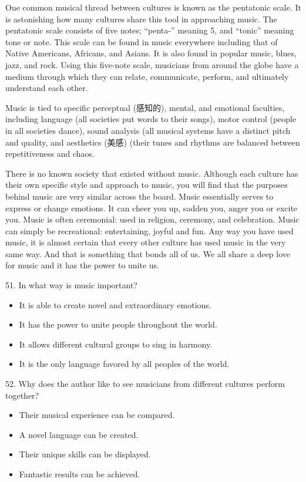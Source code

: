 \documentclass[UTF8,11pt]{ctexart}
\begin{document}
One common musical thread between cultures is known as the pentatonic scale. It is astonishing how many cultures share this tool in approaching music. The pentatonic scale consists of five notes; “penta-” meaning 5, and “tonic” meaning tone or note. This scale can be found in music everywhere including that of Native Americans, Africans, and Asians. It is also found in popular music, blues, jazz, and rock. Using this five-note scale, musicians from around the globe have a medium through which they can relate, communicate, perform, and ultimately understand each other.


Music is tied to specific perceptual (感知的), mental, and emotional faculties, including language (all societies put words to their songs), motor control (people in all societies dance), sound analysis (all musical systems have a distinct pitch and quality, and aesthetics (美感) (their tunes and rhythms are balanced between repetitiveness and chaos.


There is no known society that existed without music. Although each culture has their own specific style and approach to music, you will find that the purposes behind music are very similar across the board. Music essentially serves to express or change emotions. It can cheer you up, sadden you, anger you or excite you. Music is often ceremonial: used in religion, ceremony, and celebration. Music can simply be recreational: entertaining, joyful and fun. Any way you have used music, it is almost certain that every other culture has used music in the very same way. And that is something that bonds all of us. We all share a deep love for music and it has the power to unite us.


51. In what way is music important?


\begin{itemize}[leftmargin=2em,itemsep=.2em,topsep=.4em]\item[A.] It is able to create novel and extraordinary emotions.
\item[B.] It has the power to unite people throughout the world.
\item[C.] It allows different cultural groups to sing in harmony.
\item[D.] It is the only language favored by all peoples of the world.
\end{itemize}

52. Why does the author like to see musicians from different cultures perform together?


\begin{itemize}[leftmargin=2em,itemsep=.2em,topsep=.4em]\item[A.] Their musical experience can be compared.
\item[B.] A novel language can be created.
\item[C.] Their unique skills can be displayed.
\item[D.] Fantastic results can be achieved.
\end{itemize}
\end{document}
